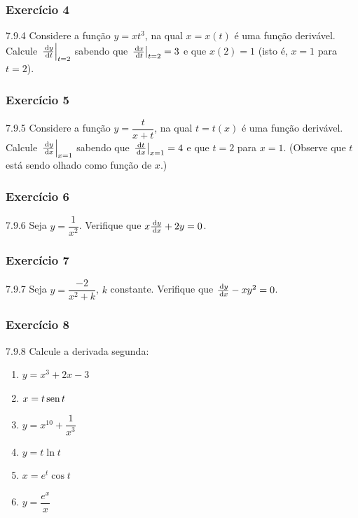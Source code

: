\subsubsection*{Exercício 4}
\begin{exercicio}[4]{7.9.4}
Considere a função $y = xt^3$, na qual $x = x(t)$ é uma função derivável. Calcule $\left.\frac{\,\mathrm{d} y}{\,\mathrm{d} t}\right|_{t = 2}$ sabendo que $\left.\frac{\,\mathrm{d} x}{\,\mathrm{d} t}\right|_{t = 2} = 3$ e que $x(2) = 1$ (isto é, $x = 1$ para $t = 2$).
\end{exercicio}

\subsubsection*{Exercício 5}
\begin{exercicio}[5]{7.9.5}
Considere a função $y = \dfrac{t}{x + t}$, na qual $t = t(x)$ é uma função derivável. Calcule $\left.\frac{\,\mathrm{d} y}{\,\mathrm{d} x}\right|_{x = 1}$ sabendo que $\left.\frac{\,\mathrm{d} t}{\,\mathrm{d} x}\right|_{x = 1} = 4$ e que $t = 2$ para $x = 1$. (Observe que $t$ está sendo olhado como função de $x$.)
\end{exercicio}

\subsubsection*{Exercício 6}
\begin{exercicio}[6]{7.9.6}
Seja $y = \dfrac{1}{x^2}$. Verifique que $x\frac{\,\mathrm{d} y}{\,\mathrm{d} x} + 2y = 0$.
\end{exercicio}

\subsubsection*{Exercício 7}
\begin{exercicio}[7]{7.9.7}
Seja $y = \dfrac{-2}{x^2 + k}$, $k$ constante. Verifique que $\frac{\,\mathrm{d} y}{\,\mathrm{d} x} - xy^2 = 0$.
\end{exercicio}

\subsubsection*{Exercício 8}
\begin{exercicio}[8]{7.9.8}
Calcule a derivada segunda:
\begin{enumerate}[label=\alph*)]
    \item $y = x^3 + 2x - 3$
    \item $x = t \operatorname{sen} t$
    \item $y = x^{10} + \dfrac{1}{x^3}$
    \item $y = t \ln t$
    \item $x = e^t \cos t$
    \item $y = \dfrac{e^x}{x}$
\end{enumerate}
\end{exercicio}

